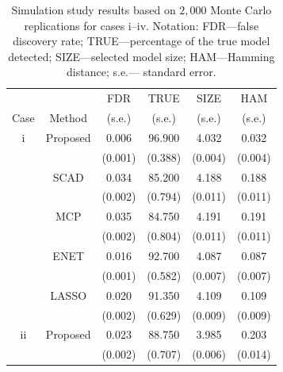 \begin{table}[h]
\centering
  \caption{Simulation study results based on $2,000$ Monte Carlo replications for cases i--iv. Notation: FDR---false discovery rate; TRUE---percentage of the true model detected; SIZE---selected model size; HAM---Hamming distance; s.e.--- standard error.}\label{T:sim1}
\begin{tabular}{c|ccccc}
\hline
 & &FDR& TRUE & SIZE & HAM   \\
Case &Method& (s.e.) & (s.e.)   & (s.e.)     & (s.e.)    \\
\hline
    i      & Proposed & 0.006   & 96.900  & 4.032   & 0.032  \\
          & & (0.001)  & (0.388)  & (0.004)    & (0.004) \\
           & SCAD                           & 0.034 & 85.200  & 4.188  & 0.188 \\
           &                         & (0.002)  & (0.794)  &(0.011)   & (0.011) \\
           & MCP                            & 0.035  & 84.750 & 4.191  & 0.191  \\
           &                             &  (0.002)  &  (0.804)  & (0.011)   & (0.011) \\
           & ENET                           & 0.016  & 92.700  & 4.087  & 0.087  \\
           &                            &(0.001)  & (0.582)  &  (0.007)   & (0.007) \\
           & LASSO                          & 0.020  & 91.350  & 4.109   & 0.109\\
           &                          & (0.002)  &  (0.629)  & (0.009)   & (0.009) \\
           \hline
  ii         & Proposed & 0.023 & 88.750& 3.985  & 0.203\\
           &  & (0.002) & (0.707) & (0.006)  & (0.014) \\


\end{tabular}
\end{table}
